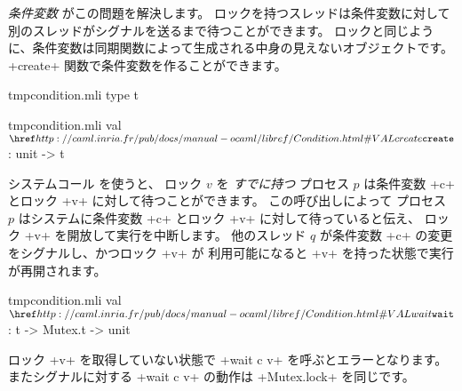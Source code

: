 \emph{条件変数} がこの問題を解決します。
ロックを持つスレッドは条件変数に対して別のスレッドがシグナルを送るまで待つことができます。
ロックと同じように、条件変数は同期関数によって生成される中身の見えないオブジェクトです。
\ml+create+ 関数で条件変数を作ることができます。
%
\begin{codefile}{tmpcondition.mli}
type t
\end{codefile}
%
\begin{listingcodefile}{tmpcondition.mli}
val $\libvalue{Condition}{create}$ : unit -> t
\end{listingcodefile}
%
システムコール  を使うと、
ロック $v$ を \emph{すでに持つ} プロセス $p$ は条件変数 \ml+c+ とロック \ml+v+
に対して待つことができます。
この呼び出しによって プロセス $p$ はシステムに条件変数 \ml+c+ とロック \ml+v+ に対して待っていると伝え、
ロック \ml+v+ を開放して実行を中断します。
他のスレッド $q$ が条件変数 \ml+c+ の変更をシグナルし、かつロック \ml+v+ が
利用可能になると \ml+v+ を持った状態で実行が再開されます。
%
\begin{listingcodefile}{tmpcondition.mli}
val $\libvalue{Condition}{wait}$ : t -> Mutex.t -> unit
\end{listingcodefile}
%
ロック \ml+v+ を取得していない状態で \ml+wait c v+ を呼ぶとエラーとなります。
またシグナルに対する \ml+wait c v+ の動作は \ml+Mutex.lock+ を同じです。


